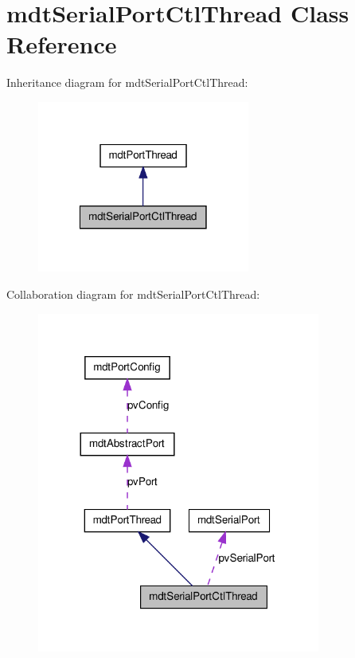 \hypertarget{classmdt_serial_port_ctl_thread}{
\section{mdtSerialPortCtlThread Class Reference}
\label{classmdt_serial_port_ctl_thread}
}


Inheritance diagram for mdtSerialPortCtlThread:\nopagebreak
\begin{figure}[H]
\begin{center}
\leavevmode
\includegraphics[width=198pt]{classmdt_serial_port_ctl_thread__inherit__graph}
\end{center}
\end{figure}


Collaboration diagram for mdtSerialPortCtlThread:
\nopagebreak
\begin{figure}[H]
\begin{center}
\leavevmode
\includegraphics[width=264pt]{classmdt_serial_port_ctl_thread__coll__graph}
\end{center}
\end{figure}
